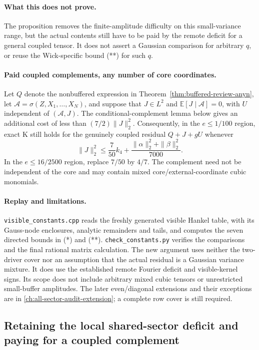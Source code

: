 \paragraph{What this does not prove.}
The proposition removes the finite-amplitude difficulty on this
small-variance range, but the actual contents still have to be paid
by the remote deficit for a general coupled tensor.
It does not assert a Gaussian comparison for arbitrary \(q\), or
reuse the Wick-specific bound (**) for such \(q\).

\paragraph{Paid coupled complements, any number of core coordinates.}
Let \(Q\) denote the nonbuffered expression in
Theorem~\ref{thm:buffered-review-anyn}, let
\(\mathcal A=\sigma(Z,X_1,\ldots,X_N)\), and suppose that \(J\in L^2\) and
\(\mathbb E[J\mid\mathcal A]=0\), with \(U\) independent of
\((\mathcal A,J)\). The conditional-complement lemma below gives
an additional cost of less than \((7/2)\|J\|_2^2\).
Consequently, in the \(e\le1/100\) region, exact K still holds for
the genuinely coupled residual \(Q+J+gU\) whenever
\[
 \|J\|_2^2\le\frac7{50}k_4+
          \frac{\|\alpha\|_2^2+\|\beta\|_2^2}{7000}.
\]
In the \(e\le16/2500\) region, replace \(7/50\) by \(4/7\).
The complement need not be independent of the core and may contain
mixed core/external-coordinate cubic monomials.

\paragraph{Replay and limitations.}
\texttt{visible\_constants.cpp} reads the freshly generated visible
Hankel table, with its Gauss-node enclosures, analytic remainders and
tails, and computes the seven directed bounds in (*) and (**).
\texttt{check\_constants.py} verifies the comparisons and the final
rational matrix calculation.
The new argument uses neither the two-driver cover nor an assumption
that the actual residual is a Gaussian variance mixture.
It does use the established remote Fourier deficit and visible-kernel
signs. Its scope does not include arbitrary mixed cubic tensors or
unrestricted small-buffer amplitudes. The later even/diagonal extensions
and their exceptions are in \autoref{ch:all-sector-audit-extension}; a
complete row cover is still required.

\subsection{Retaining the local shared-sector deficit and paying for a coupled complement}
\label{sec:buffered-two-driver-retained}

